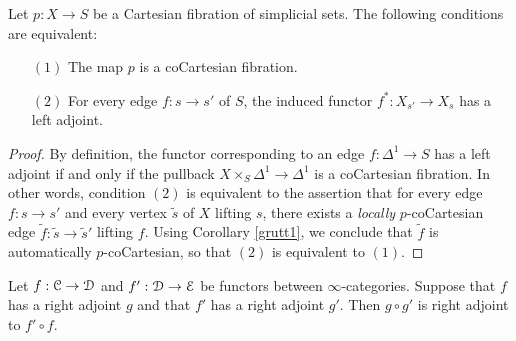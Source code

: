 \begin{corollary}\label{getcocart}
Let $p: X \rightarrow S$ be a Cartesian fibration of simplicial sets. The following conditions are equivalent:
\begin{itemize}
\item[$(1)$] The map $p$ is a coCartesian fibration. 
\item[$(2)$] For every edge $f: s \rightarrow s'$ of $S$, the induced functor
$f^{\ast}: X_{s'} \rightarrow X_{s}$ has a left adjoint.
\end{itemize}
\end{corollary}

\begin{proof}
By definition, the functor corresponding to an edge $f: \Delta^1 \rightarrow S$ has a left adjoint if and only if the pullback $X \times_{S} \Delta^1 \rightarrow \Delta^1$ is a coCartesian fibration.
In other words, condition $(2)$ is equivalent to the assertion that for every
edge $f: s \rightarrow s'$ and every vertex $\widetilde{s}$ of $X$ lifting $s$, there
exists a {\em locally} $p$-coCartesian edge $\widetilde{f}: \widetilde{s} \rightarrow \widetilde{s}'$ lifting $f$. Using Corollary \ref{grutt1}, we conclude that $\widetilde{f}$ is automatically
$p$-coCartesian, so that $(2)$ is equivalent to $(1)$.
\end{proof}

\begin{proposition}\label{compadjoint}
Let $f: \operatorname{\mathcal{C}} \rightarrow \operatorname{\mathcal{D}}$ and $f': \operatorname{\mathcal{D}} \rightarrow \operatorname{\mathcal{E}}$ be functors between $\infty$-categories. Suppose that $f$ has a right adjoint $g$ and that $f'$ has a right adjoint $g'$. Then
$g \circ g'$ is right adjoint to $f' \circ f$.
\end{proposition}

